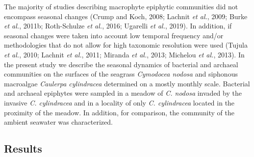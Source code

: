 \documentclass[12pt,]{article}
\begin{document}
The majority of studies describing macrophyte epiphytic communities did
not encompass seasonal changes (Crump and Koch, 2008; Lachnit \emph{et
al.}, 2009; Burke \emph{et al.}, 2011b; Roth-Schulze \emph{et al.},
2016; Ugarelli \emph{et al.}, 2019). In addition, if seasonal changes
were taken into account low temporal frequency and/or methodologies that
do not allow for high taxonomic resolution were used (Tujula \emph{et
al.}, 2010; Lachnit \emph{et al.}, 2011; Miranda \emph{et al.}, 2013;
Michelou \emph{et al.}, 2013). In the present study we describe the
seasonal dynamics of bacterial and archaeal communities on the surfaces
of the seagrass \emph{Cymodocea nodosa} and siphonous macroalgae
\emph{Caulerpa cylindracea} determined on a mostly monthly scale.
Bacterial and archaeal epiphytes were sampled in a meadow of \emph{C.
nodosa} invaded by the invasive \emph{C. cylindracea} and in a locality
of only \emph{C. cylindracea} located in the proximity of the meadow. In
addition, for comparison, the community of the ambient seawater was
characterized.

\newpage

\hypertarget{results}{%
\subsection{Results}\label{results}}
\end{document}
